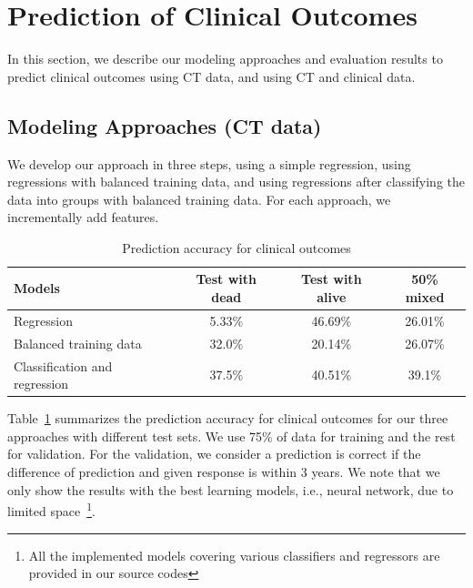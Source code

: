 \section{Prediction of Clinical Outcomes}
\label{sec:outcome}

In this section, we describe our modeling approaches and evaluation results to predict clinical outcomes using CT data, and using CT and clinical data.



\subsection{Modeling Approaches (CT data)}
\label{sec:model_ct}

We develop our approach in three steps, using a simple regression, using regressions with balanced training data, and using regressions after classifying the data into groups with balanced training data.
For each approach, we incrementally add features.


\begin{table}[!h]
    \centering
    \caption{Prediction accuracy for clinical outcomes}
    \begin{tabular}{l||c|c|c}
        \toprule[0.8pt]
         \textbf{Models} & \textbf{Test with dead} & \textbf{Test with alive} & \textbf{50\% mixed} \\\hline
         Regression                     & 5.33\% & 46.69\% & 26.01\% \\
         Balanced training data     & 32.0\% & 20.14\% & 26.07\% \\
         Classification and regression & 37.5\% & 40.51\% & 39.1\%\\
        \bottomrule[0.8pt]
    \end{tabular}
    \label{tab:clinical}
\end{table}


Table~\ref{tab:clinical} summarizes the prediction accuracy for clinical outcomes for our three approaches with different test sets.
We use 75\% of data for training and the rest for validation.
For the validation, we consider a prediction is correct if the difference of prediction and given response is within 3 years.
We note that we only show the results with the best learning models, i.e., neural network, due to limited space~\footnote{All the implemented models covering various classifiers and regressors are provided in our source codes}.

